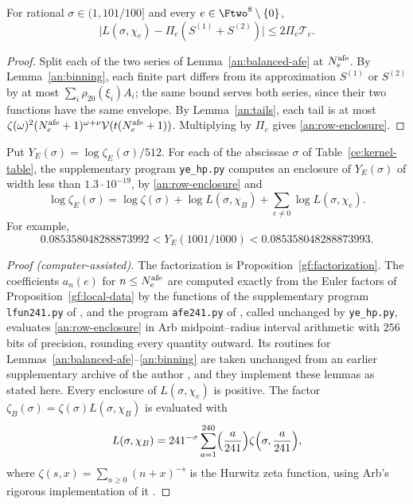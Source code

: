\begin{lemma}\label{an:row}
For rational $\sigma\in(1,101/100]$ and every $e\in\Ftwo^8\setminus\{0\}$,
\begin{equation}\label{an:row-enclosure}
 \bigl|L(\sigma,\chi_e)-\Pi_e(S^{(1)}+S^{(2)})\bigr|
 \le2\Pi_e\mathcal T_e.
\end{equation}
\end{lemma}

\begin{proof}
Split each of the two series of Lemma~\ref{an:balanced-afe} at
$N^{\rm afe}_e$. By Lemma~\ref{an:binning}, each finite part differs from its
approximation $S^{(1)}$ or $S^{(2)}$ by at most $\sum_i\rho_{20}(\xi_i)A_i$; the
same bound serves both series, since their two functions have the same
envelope. By Lemma~\ref{an:tails}, each tail is at most
$\zeta(\omega)^2(N^{\rm afe}_e+1)^{\omega+\nu}\mathcal V(t(N^{\rm afe}_e+1))$. Multiplying by
$\Pi_e$ gives \eqref{an:row-enclosure}.
\end{proof}

\begin{proposition}\label{an:genus-value}
Put $Y_E(\sigma)=\log\zeta_E(\sigma)/512$. For each of the abscissae
$\sigma$ of Table~\ref{ce:kernel-table}, the supplementary program
\texttt{ye\_hp.py} computes an enclosure of $Y_E(\sigma)$ of width less than
$1.3\cdot10^{-19}$, by \eqref{an:row-enclosure} and
\[
 \log\zeta_E(\sigma)=\log\zeta(\sigma)+\log L(\sigma,\chi_B)
 +\sum_{e\ne0}\log L(\sigma,\chi_e).
\]
For example,
\[
 0.085358048288873992<Y_E(1001/1000)<0.085358048288873993.
\]
\end{proposition}

\begin{proof}[Proof (computer-assisted)]
The factorization is Proposition~\ref{gf:factorization}. The coefficients
$a_n(e)$ for $n\le N^{\rm afe}_e$ are computed exactly from the Euler factors of
Proposition~\ref{gf:local-data} by the functions of the supplementary program
\texttt{lfun241.py} of \cite{Naslund04273}, and the program \texttt{afe241.py}
of \cite{Naslund04273}, called unchanged by \texttt{ye\_hp.py}, evaluates
\eqref{an:row-enclosure} in Arb midpoint--radius interval arithmetic
\cite{Johansson2017,FLINT} with $256$ bits of precision, rounding every
quantity outward. Its routines for
Lemmas~\ref{an:balanced-afe}--\ref{an:binning} are taken unchanged from an
earlier supplementary archive of the author \cite{Naslund0418235}, and
they implement these lemmas as stated here. Every enclosure of
$L(\sigma,\chi_e)$ is positive. The factor $\zeta_B(\sigma)=\zeta(\sigma)
L(\sigma,\chi_B)$ is evaluated with
\[
 L(\sigma,\chi_B)=241^{-\sigma}\sum_{a=1}^{240}\Bigl(\frac
 a{241}\Bigr)\zeta\Bigl(\sigma,\frac a{241}\Bigr),
\]
where $\zeta(s,x)=\sum_{n\ge0}(n+x)^{-s}$ is the Hurwitz zeta function,
using Arb's rigorous implementation of it \cite{Johansson2015Hurwitz}.
\end{proof}

